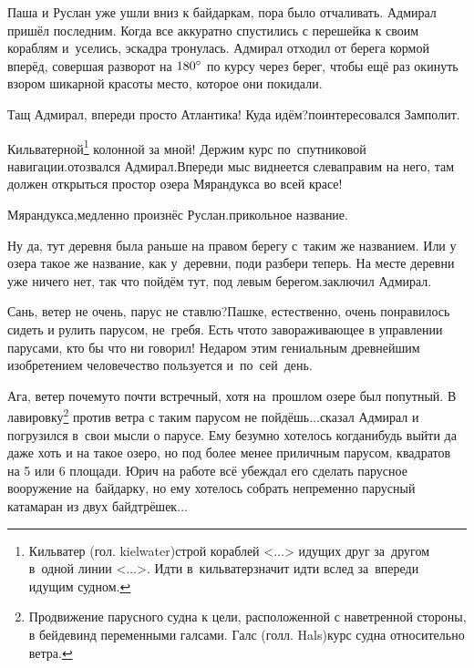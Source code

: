 Паша и Руслан уже ушли вниз к байдаркам, пора было отчаливать. Адмирал пришёл последним. Когда все аккуратно спустились с перешейка к своим кораблям и~уселись, эскадра тронулась. Адмирал отходил от берега кормой вперёд, совершая разворот на $180\degree$ по курсу через берег, чтобы ещё раз окинуть взором шикарной красоты место, которое они покидали. 

\diagdash Тащ Адмирал, впереди просто Атлантика! Куда идём?\mdash поинтересовался Замполит.

\renewcommand*{\thefootnote}{\fnsymbol{footnote}}
\setcounter{footnote}{0}
\diagdash Кильватерной\footnote{Кильватер (гол. kielwater)\mdash строй кораблей <$\dots$> идущих друг за~другом в~одной линии <$\dots$>. Идти в~кильватер\mdash значит идти вслед за~впереди идущим судном.} колонной за мной! Держим курс по~спутниковой навигации.\mdash отозвался Адмирал.\mdash Впереди мыс виднеется слева\mdash правим на него, там должен открыться простор озера Мярандукса во всей красе!

\diagdash Мярандукса,\mdash медленно произнёс Руслан.\mdash прикольное название.

\diagdash Ну да, тут деревня была раньше на правом берегу с~таким же названием. Или у озера такое же название, как у~деревни, поди разбери теперь. На месте деревни уже ничего нет, так что пойдём тут, под левым берегом.\mdash заключил Адмирал.

\diagdash Сань, ветер не очень, парус не ставлю?\mdash Пашке, естественно, очень понравилось сидеть и рулить парусом, не~гребя. Есть что\sdash то завораживающее в управлении парусами, кто бы что ни говорил! Недаром этим гениальным древнейшим изобретением человечество пользуется и~по~сей~день.

\renewcommand*{\thefootnote}{\fnsymbol{footnote}}
\setcounter{footnote}{0}
\diagdash Ага, ветер почему\sdash то почти встречный, хотя на~прошлом озере был попутный. В лавировку\footnote{Продвижение парусного судна к цели, расположенной с наветренной стороны, в бейдевинд переменными галсами. Галс (голл. Hals)\mdash курс судна относительно ветра.} против ветра с таким парусом не пойдёшь$\ldots$\mdash сказал Адмирал и погрузился в~свои мысли о парусе. Ему безумно хотелось когда\sdash нибудь выйти да даже хоть и на такое озеро, но под более менее приличным парусом, квадратов на 5 или 6 площади. Юрич на работе всё убеждал его сделать парусное вооружение на~байдарку, но ему хотелось собрать непременно парусный катамаран из двух байд\sdash трёшек$\ldots$

